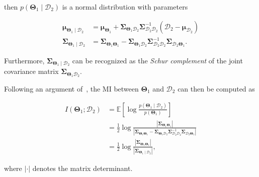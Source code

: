 \noindent then $p(\mathbf{\Theta}_1\mid\mathcal{D}_2)$ is a normal distribution
with parameters

\begin{equation}\label{eqn:joint_conditional}
  \begin{aligned}
  \boldsymbol{\mu}_{\boldsymbol{\Theta}_1\mid\mathcal{D}_2} &=
    \boldsymbol{\mu}_{\boldsymbol{\Theta}_1} +
    \boldsymbol{\Sigma}_{\boldsymbol{\Theta}_1\mathcal{D}_2}
    \boldsymbol{\Sigma}_{\mathcal{D}_2\mathcal{D}_2}^{-1}
    (\mathcal{D}_2 - \boldsymbol{\mu}_{\mathcal{D}_2})\\
  \boldsymbol{\Sigma}_{\boldsymbol{\Theta}_1\mid\mathcal{D}_2} &=
    \boldsymbol{\Sigma}_{\boldsymbol{\Theta}_1\boldsymbol{\Theta}_1} -
    \boldsymbol{\Sigma}_{\boldsymbol{\Theta}_1\mathcal{D}_2}
    \boldsymbol{\Sigma}_{\mathcal{D}_2\mathcal{D}_2}^{-1}
    \boldsymbol{\Sigma}_{\mathcal{D}_2\boldsymbol{\Theta}_1}.
  \end{aligned}
\end{equation}

Furthermore, $\boldsymbol{\Sigma}_{\boldsymbol{\Theta}_1\mid\mathcal{D}_2}$ can
be recognized as the \emph{Schur complement} of the joint covariance matrix
$\boldsymbol{\Sigma}_{\boldsymbol{\Theta}_1\mathcal{D}_2}$.

Following an argument of~\cite{davison05active}, the MI between
$\mathbf{\Theta}_1$ and $\mathcal{D}_2$ can then be computed as

\begin{equation}\label{eqn:mi_normal}
  \begin{aligned}
  I(\mathbf{\Theta}_1;\mathcal{D}_2) &=
    \mathbb{E}\left[\log
    \frac{p(\mathbf{\Theta}_1\mid\mathcal{D}_2)}{p(\mathbf{\Theta}_1)}\right]\\
    &= \frac{1}{2}\log\frac{|\boldsymbol{\Sigma}_{\boldsymbol{\Theta}_1
    \boldsymbol{\Theta}_1}|}
    {|\boldsymbol{\Sigma}_{\boldsymbol{\Theta}_1\boldsymbol{\Theta}_1} -
    \boldsymbol{\Sigma}_{\boldsymbol{\Theta}_1\mathcal{D}_2}
    \boldsymbol{\Sigma}_{\mathcal{D}_2\mathcal{D}_2}^{-1}
    \boldsymbol{\Sigma}_{\mathcal{D}_2\boldsymbol{\Theta}_1}|}\\
    &= \frac{1}{2}\log\frac{|\boldsymbol{\Sigma}_{\boldsymbol{\Theta}_1
    \boldsymbol{\Theta}_1}|}
    {|\boldsymbol{\Sigma}_{\boldsymbol{\Theta}_1\mid\mathcal{D}_2}|},
  \end{aligned}
\end{equation}

\noindent where $|\cdot|$ denotes the matrix determinant.

